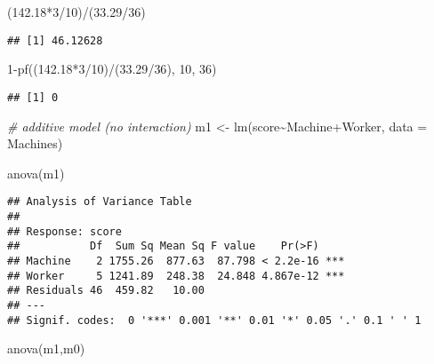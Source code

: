 \documentclass[
]{book}
\newenvironment{Shaded}{\begin{snugshade}}{\end{snugshade}}
\newcommand{\AttributeTok}[1]{\textcolor[rgb]{0.77,0.63,0.00}{#1}}
\newcommand{\CommentTok}[1]{\textcolor[rgb]{0.56,0.35,0.01}{\textit{#1}}}
\newcommand{\DecValTok}[1]{\textcolor[rgb]{0.00,0.00,0.81}{#1}}
\newcommand{\FloatTok}[1]{\textcolor[rgb]{0.00,0.00,0.81}{#1}}
\newcommand{\FunctionTok}[1]{\textcolor[rgb]{0.00,0.00,0.00}{#1}}
\newcommand{\NormalTok}[1]{#1}
\newcommand{\OtherTok}[1]{\textcolor[rgb]{0.56,0.35,0.01}{#1}}
\newcommand{\SpecialCharTok}[1]{\textcolor[rgb]{0.00,0.00,0.00}{#1}}
\begin{document}
\begin{Shaded}
\begin{Highlighting}[]
\NormalTok{(}\FloatTok{142.18}\SpecialCharTok{*}\DecValTok{3}\SpecialCharTok{/}\DecValTok{10}\NormalTok{)}\SpecialCharTok{/}\NormalTok{(}\FloatTok{33.29}\SpecialCharTok{/}\DecValTok{36}\NormalTok{)}
\end{Highlighting}
\end{Shaded}

\begin{verbatim}
## [1] 46.12628
\end{verbatim}

\begin{Shaded}
\begin{Highlighting}[]
\DecValTok{1}\SpecialCharTok{{-}}\FunctionTok{pf}\NormalTok{((}\FloatTok{142.18}\SpecialCharTok{*}\DecValTok{3}\SpecialCharTok{/}\DecValTok{10}\NormalTok{)}\SpecialCharTok{/}\NormalTok{(}\FloatTok{33.29}\SpecialCharTok{/}\DecValTok{36}\NormalTok{), }\DecValTok{10}\NormalTok{, }\DecValTok{36}\NormalTok{)}
\end{Highlighting}
\end{Shaded}

\begin{verbatim}
## [1] 0
\end{verbatim}

\begin{Shaded}
\begin{Highlighting}[]
\CommentTok{\# additive model (no interaction)}
\NormalTok{m1 }\OtherTok{\textless{}{-}} \FunctionTok{lm}\NormalTok{(score}\SpecialCharTok{\textasciitilde{}}\NormalTok{Machine}\SpecialCharTok{+}\NormalTok{Worker, }\AttributeTok{data =}\NormalTok{ Machines)}

\FunctionTok{anova}\NormalTok{(m1)}
\end{Highlighting}
\end{Shaded}

\begin{verbatim}
## Analysis of Variance Table
## 
## Response: score
##           Df  Sum Sq Mean Sq F value    Pr(>F)    
## Machine    2 1755.26  877.63  87.798 < 2.2e-16 ***
## Worker     5 1241.89  248.38  24.848 4.867e-12 ***
## Residuals 46  459.82   10.00                      
## ---
## Signif. codes:  0 '***' 0.001 '**' 0.01 '*' 0.05 '.' 0.1 ' ' 1
\end{verbatim}

\begin{Shaded}
\begin{Highlighting}[]
\FunctionTok{anova}\NormalTok{(m1,m0)}
\end{Highlighting}
\end{Shaded}
\end{document}
